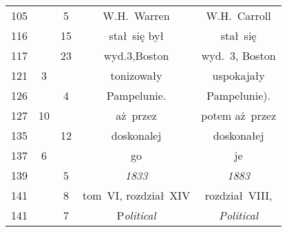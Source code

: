 \documentclass[a4paper,11pt]{article}
\begin{document}
\begin{center}
\begin{tabular}{|c|c|c|c|c|}
    105 & & \hphantom{0}5 & W.H.~Warren & W.H.~Carroll \\
    116 & & 15 & stał~się był & stał~się \\
    117 & & 23 & wyd.3,Boston & wyd.~3, Boston \\
    121 & \hphantom{0}3 & & tonizowały & uspokajały \\
    126 & & \hphantom{0}4 & Pampelunie. & Pampelunie). \\
    127 & 10 & & aż~przez & potem aż~przez \\
    135 & & 12 & doskonalej & doskonałej \\
    137 & \hphantom{0}6 & & go & je \\
    139 & & \hphantom{0}5 & \textit{1833} & \textit{1883} \\
    141 & & \hphantom{0}8 & tom~VI, rozdział~XIV & rozdział~VIII, \\
    141 & & \hphantom{0}7 & P\textit{olitical} & \textit{Political} \\
    \hline
  \end{tabular}





  \newpage


\end{center}
\end{document}
